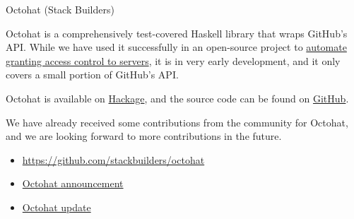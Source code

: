 \documentclass[DIV16,twocolumn,10pt]{scrreprt}
\begin{document}
\begin{hcarentry}{Octohat (Stack Builders)}
\makeheader

Octohat is a comprehensively test-covered Haskell library that wraps
GitHub's API. While we have used it successfully in an open-source
project to
\href{https://hackage.haskell.org/package/openssh-github-keys}{automate
  granting access control to servers}, it is in very early
development, and it only covers a small portion of GitHub's API.

Octohat is available on
\href{http://hackage.haskell.org/package/octohat}{Hackage}, and
the source code can be found on
\href{https://github.com/stackbuilders/octohat}{GitHub}.

We have already received some contributions from the community for
Octohat, and we are looking forward to more contributions in the
future.

\FurtherReading
\begin{itemize}
\item
  \url{https://github.com/stackbuilders/octohat}
\item
  \href{http://www.stackbuilders.com/news/announcing-octohat-a-new-haskell-wrapper-for-github-s-api}{Octohat announcement}
\item
  \href{http://www.stackbuilders.com/news/new-octohat-release}{Octohat update}
\end{itemize}
\end{hcarentry}
\end{document}
